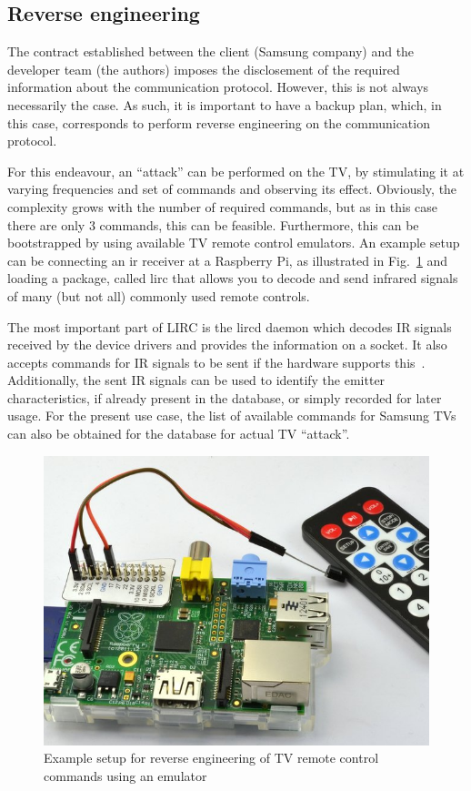 \subsection{Reverse engineering}
\label{sec:reverse-engineering}
The contract established between the client (Samsung company) and the developer
team (the authors) imposes the disclosement of the required information about
the communication protocol. However, this is not always necessarily the case. As
such, it is important to have a backup plan, which, in this case, corresponds to
perform reverse engineering on the communication protocol.

For this endeavour, an ``attack'' can be performed on the TV, by stimulating it
at varying frequencies and set of commands and observing its effect. Obviously,
the complexity grows with the number of required commands, but as in this case
there are only 3 commands, this can be feasible. Furthermore, this can be
bootstrapped by using available TV remote control emulators. An example setup
can be connecting an \gls{ir} receiver at a Raspberry Pi, as illustrated in
Fig.~\ref{fig:rasp-lirc} and loading a package, called \gls{lirc} that allows you to decode and send infrared signals of many (but not all) commonly used remote controls.

The most important part of LIRC is the lircd daemon which decodes IR signals
received by the device drivers and provides the information on a socket. It also
accepts commands for IR signals to be sent if the hardware supports
this~\cite{lirc}. Additionally, the sent IR signals can be used to identify the
emitter characteristics, if already present in the database, or simply recorded
for later usage. For the present use case, the list of available commands for
Samsung TVs can also be obtained for the database for actual TV ``attack''.
%
\begin{figure}[htb!]
\centering
    \includegraphics[width=0.45\columnwidth]{./img/rasp-reverse-engineering-setup.jpg}
  \caption{Example setup for reverse engineering of TV remote control commands
    using an emulator~\cite{rasp-lirc}}%
\label{fig:rasp-lirc}
\end{figure}


